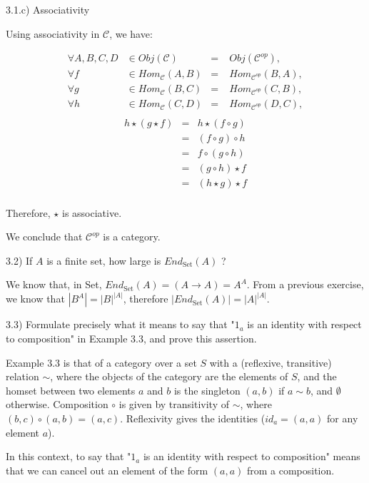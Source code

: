3.1.c) Associativity

Using associativity in $\mathcal{C}$, we have:

$$
\begin{align*}
	\forall A, B, C, D & \in Obj (\mathcal{C})        &=& \;  Obj (\mathcal{C}^{op})        , \\
	\forall f          & \in Hom_{\mathcal{C}} (A, B) &=& \;  Hom_{\mathcal{C}^{op}} (B, A) , \\
	\forall g          & \in Hom_{\mathcal{C}} (B, C) &=& \;  Hom_{\mathcal{C}^{op}} (C, B) , \\
	\forall h          & \in Hom_{\mathcal{C}} (C, D) &=& \;  Hom_{\mathcal{C}^{op}} (D, C) , \\
\end{align*}
$$
$$
\begin{align*}
	h \star (g \star f) &=&  h \star (f  \circ g) \\
						&=& (f \circ  g) \circ h  \\
						&=&  f \circ  (g \circ h) \\
						&=&  (g \circ h) \star f  \\
						&=&  (h \star g) \star f  \\
\end{align*}
$$

Therefore, $\star$ is associative.

We conclude that $\mathcal{C}^{op}$ is a category.



3.2) If $A$ is a finite set, how large is $End_{\text{Set}}(A)$ ?

We know that, in Set, $End_{\text{Set}}(A) = (A \to A) = A^A$. From a previous exercise, we know that $|B^A| = |B|^|A|$, therefore $|End_{\text{Set}}(A)| = |A|^|A|$.



3.3) Formulate precisely what it means to say that "$1_a$ is an identity with respect to composition" in Example 3.3, and prove this assertion.

Example 3.3 is that of a category over a set $S$ with a (reflexive, transitive) relation $\sim$, where the objects of the category are the elements of $S$, and the homset between two elements $a$ and $b$ is the singleton $(a,b)$ if $a \sim b$, and $\emptyset$ otherwise. Composition $\circ$ is given by transitivity of $\sim$, where $(b,c) \circ (a,b) = (a,c)$. Reflexivity gives the identities ($id_a = (a,a)$ for any element $a$).

In this context, to say that "$1_a$ is an identity with respect to composition" means that we can cancel out an element of the form $(a,a)$ from a composition.


